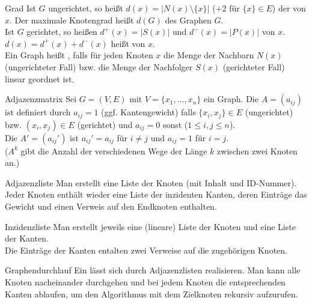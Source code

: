 \begin{Def}{Grad}
    Ist $G$ ungerichtet, so heißt
    $d(x) = |N(x) \setminus \{x\}|$
    ($+2$ für $\{x\} \in E$) der  von $x$.
    Der maximale Knotengrad heißt  $d(G)$ des Graphen $G$. \\
    Ist $G$ gerichtet, so heißen
    $d^{\boldsymbol{+}}(x) = |S(x)|$  und
    $d^{\boldsymbol{-}}(x) = |P(x)|$  von $x$.
    $d(x) = d^{\boldsymbol{+}}(x) + d^{\boldsymbol{-}}(x)$ heißt
     von $x$. \\
    Ein Graph heißt , falls für jeden Knoten $x$
    die Menge der Nachbarn $N(x)$ (ungerichteter Fall) bzw.
    die Menge der Nachfolger $S(x)$ (gerichteter Fall)
    linear geordnet ist.
\end{Def}

\begin{Def}{Adjazenzmatrix}
    Sei $G = (V, E)$ mit $V = \{x_1, \ldots, x_n\}$ ein Graph.
    Die  $A = (a_{ij})$ ist definiert durch
    $a_{ij} = 1$ (ggf. Kantengewicht) falls $\{x_i, x_j\} \in E$ (ungerichtet)
    bzw. $(x_i, x_j) \in E$ (gerichtet) und $a_{ij} = 0$ sonst
    ($1 \le i,j \le n$). \\
    Die 
    $A' = (a_{ij}')$ ist
    $a_{ij}' = a_{ij}$ für $i \not= j$ und $a_{ij} = 1$ für $i = j$. \\
    ($A^k$ gibt die Anzahl der verschiedenen Wege der Länge $k$ zwischen zwei
    Knoten an.)
\end{Def}

\begin{Def}{Adjazenzliste}
    Man erstellt eine Liste der Knoten (mit Inhalt und ID-Nummer).
    Jeder Knoten enthält wieder eine Liste der inzidenten Kanten,
    deren Einträge das Gewicht und einen Verweis auf den Endknoten enthalten.
\end{Def}

\begin{Def}{Inzidenzliste}
    Man erstellt jeweils eine (lineare) Liste der Knoten und eine Liste der
    Kanten. \\
    Die Einträge der Kanten entalten zwei Verweise auf die zugehörigen Knoten.
\end{Def}

\begin{Def}{Graphendurchlauf}
    Ein  lässt sich durch Adjazenzlisten realisieren.
    Man kann alle Knoten nacheinander durchgehen und bei jedem Knoten
    die entsprechenden Kanten ablaufen, um den Algorithmus mit dem Zielknoten
    rekursiv aufzurufen.
\end{Def}

